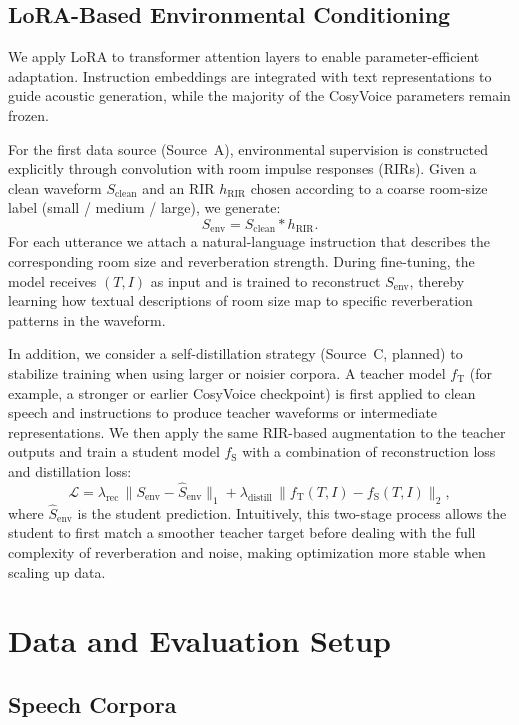 \documentclass{article}
\begin{document}
\subsection{LoRA-Based Environmental Conditioning}

We apply LoRA to transformer attention layers to enable parameter-efficient adaptation. Instruction embeddings are integrated with text representations to guide acoustic generation, while the majority of the CosyVoice parameters remain frozen.

For the first data source (Source~A), environmental supervision is constructed explicitly through convolution with room impulse responses (RIRs). Given a clean waveform $S_{\text{clean}}$ and an RIR $h_{\text{RIR}}$ chosen according to a coarse room-size label (small / medium / large), we generate:
\[
S_{\text{env}} = S_{\text{clean}} * h_{\text{RIR}}.
\]
For each utterance we attach a natural-language instruction that describes the corresponding room size and reverberation strength. During fine-tuning, the model receives $(T, I)$ as input and is trained to reconstruct $S_{\text{env}}$, thereby learning how textual descriptions of room size map to specific reverberation patterns in the waveform.

In addition, we consider a self-distillation strategy (Source~C, planned) to stabilize training when using larger or noisier corpora. A teacher model $f_{\text{T}}$ (for example, a stronger or earlier CosyVoice checkpoint) is first applied to clean speech and instructions to produce teacher waveforms or intermediate representations. We then apply the same RIR-based augmentation to the teacher outputs and train a student model $f_{\text{S}}$ with a combination of reconstruction loss and distillation loss:
\[
\mathcal{L} = \lambda_{\text{rec}} \, \| S_{\text{env}} - \hat{S}_{\text{env}} \|_1 + \lambda_{\text{distill}} \, \| f_{\text{T}}(T,I) - f_{\text{S}}(T,I) \|_2,
\]
where $\hat{S}_{\text{env}}$ is the student prediction. Intuitively, this two-stage process allows the student to first match a smoother teacher target before dealing with the full complexity of reverberation and noise, making optimization more stable when scaling up data.

\section{Data and Evaluation Setup}

\subsection{Speech Corpora}
\end{document}
